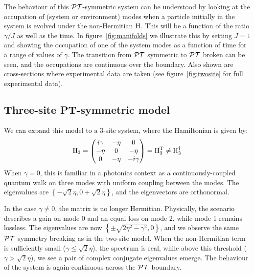 The behaviour of this \(\mathcal{PT}{}\)-symmetric system can be understood by looking at
the occupation of (system or environment) modes when a particle initially in the
system is evolved under the non-Hermitian \(\mathrm{H}\). This will be a function
of the ratio \(\gamma/J\) as well as the time. In figure~\ref{fig:manifolds} we
illustrate this by setting \(J=1\) and showing the occupation of one of the
system modes as a function of time for a range of values of \(\gamma\). The
transition from \(\mathcal{PT}{}\) symmetric to \(\mathcal{PT}{}\) broken can be seen, and the
occupations are continuous over the boundary. Also shown are cross-sections
where experimental data are taken (see figure~\ref{fig:twosite} for full
experimental data).

\subsection{Three-site PT-symmetric model}
\label{sec:ThreeSite}
We can expand this model to a 3-site system, where the Hamiltonian is given by:
\begin{equation}
  \mathrm{H}_{3} = \begin{pmatrix}
    i \gamma & -\eta & 0 \\
    -\eta & 0 & -\eta \\
    0 & -\eta & -i \gamma \\
  \end{pmatrix} = \mathrm{H}_{3}^{\mathrm{T}} \neq \mathrm{H}_{3}^{\dagger}
\end{equation}
When \(\gamma=0\), this is familiar in a photonics context as a
continuously-coupled quantum walk on three modes with uniform coupling between
the modes. The eigenvalues are \(\left\{ -\sqrt{2} \eta, 0 +\sqrt{2}
\eta\right\}\), and the eigenvectors are orthonormal.

In the case \(\gamma \neq 0\), the matrix is no longer Hermitian. Physically,
the scenario describes a gain on mode 0 and an equal loss on mode 2, while
mode 1 remains lossless. The eigenvalues are now \(\left\{ \pm \sqrt{2 \eta^{2}
- \gamma^{2}}, 0 \right\}\), and we observe the same \(\mathcal{PT}\) symmetry breaking
as in the two-site model. When the non-Hermitian term is sufficiently small
(\(\gamma \leq \sqrt{2} \eta\)), the spectrum is real, while above this
threshold (\(\gamma > \sqrt{2} \eta\)), we see a pair of complex conjugate
eigenvalues emerge. The behaviour of the system is again continuous across the
\(\mathcal{PT}\) boundary.

